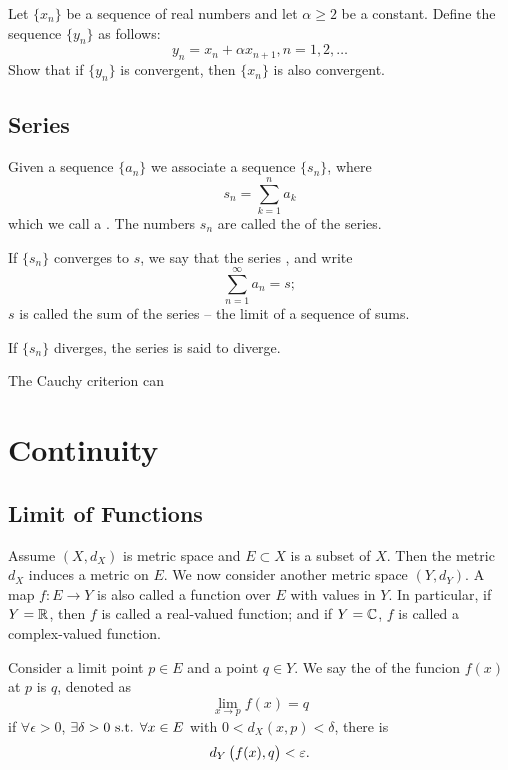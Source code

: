 \begin{prbm}
Let $\{x_n\}$ be a sequence of real numbers and let $\alpha\ge2$ be a constant. Define the sequence $\{y_n\}$ as follows:
\[ y_n=x_n+\alpha x_{n+1}, n=1,2,\dots \]
Show that if $\{y_n\}$ is convergent, then $\{x_n\}$ is also convergent.
\end{prbm}
\pagebreak

\section{Series}
\begin{definition}
Given a sequence $\{a_n\}$ we associate a sequence $\{s_n\}$, where
\[ s_n=\sum_{k=1}^na_k \]
which we call a . The numbers $s_n$ are called the  of the series.

If $\{s_n\}$ converges to $s$, we say that the series , and write
\[ \sum_{n=1}^\infty a_n=s; \]
$s$ is called the sum of the series -- the limit of a sequence of sums.

If $\{s_n\}$ diverges, the series is said to diverge.
\end{definition}

The Cauchy criterion can 

\begin{proposition}

\end{proposition}

\chapter{Continuity}
\section{Limit of Functions}
Assume $(X,d_X)$ is metric space and $E\subset X$ is a subset of $X$. Then the metric $d_X$ induces a metric on $E$. We now consider another metric space $(Y,d_Y)$. A map $f:E\to Y$ is also called a function over $E$ with values in $Y$. In particular, if $Y=\mathbb R$, then $f$ is called a real-valued function; and if $Y=\mathbb C$, $f$ is called a complex-valued function.

\begin{definition}\label{defn:limit-function}
Consider a limit point $p\in E$ and a point $q\in Y$. We say the  of the funcion $f(x)$ at $p$ is $q$, denoted as
\[ \lim_{x\to p}f(x)=q \]
if $\forall\epsilon>0$, $\exists\delta>0\text{ s.t. }\forall x\in E$ with $0<d_X(x,p)<\delta$, there is
\[ d_Y\left(f(x), q\right)<\varepsilon. \]
\end{definition}

